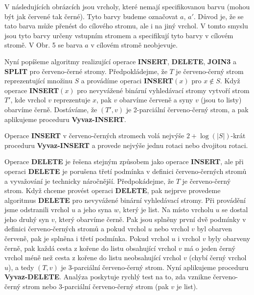 \documentclass[a4paper,12pt]{article}
\begin{document}
V následujících obrázcích jsou vrcholy, které 
nemají specifikovanou barvu (mohou být jak červené tak černé).
Tyto barvy budeme označovat $a$, $a'$. Důvod je, že se 
tato barva může přenést do cílového stromu, ale 
i na jiný vrchol. V tomto smyslu jsou tyto barvy určeny vstupním 
stromem a specifikují tyto barvy v cílovém stromě. V Obr. 5 
se barva $a$ v cílovém stromě neobjevuje.

\midinsert
\centerline{}
\endcaption
\endinsert

\midinsert
\centerline{}
\endcaption
\endinsert
\newpage

\midinsert
\centerline{}
\endcaption
\endinsert

\midinsert
\centerline{}
\endcaption
\endinsert

Nyní popíšeme algoritmy realizující operace {\bf INSERT}, 
{\bf DE\-LE\-TE}, {\bf JOIN3} a {\bf SPLIT} pro červeno-černé stromy.  
Před\-po\-klá\-dejme, že $T$ je červeno-černý strom reprezentující 
množinu $S$ a pro\-vá\-dí\-me operaci {\bf INSERT$(x)$} pro $
x\notin S$.  Když 
ope\-race {\bf IN\-SERT$(x)$} pro nevyvážené binární vyhledávací stro\-my 
vytvoří strom $T'$, kde vrchol $v$ reprezentuje $x$, pak $
v$ 
obar\-ví\-me červeně a syny $v$ (jsou to listy) obarvíme černě.  
Dostáváme, že $(T',v)$ je 2-parciální červeno-černý strom, a pak 
aplikujeme proceduru {\bf Vyvaz-INSERT}.  

Operace {\bf INSERT} v červeno-černých stromech 
volá nejvýše $2+\log(|S|)$-krát proceduru {\bf Vyvaz-INSERT} a 
provede nejvýše jednu rotaci nebo dvojitou rotaci.

Operace {\bf DELETE} je řešena stejným způsobem 
jako ope\-race {\bf INSERT}, ale při operaci {\bf DELETE} je porušena třetí 
pod\-mín\-ka v definici červeno-černých stro\-mů a 
vyvažování je technicky náročnější.  
Předpokádejme, že $T$ je červeno-černý strom. Když chceme 
provést operaci {\bf DELETE}, pak nejprve provedeme algoritmus {\bf DELETE} 
pro nevyvážené 
binární vyhledávací stro\-my. Při provádění jsme 
odstranili vrchol $u$ a jeho syna $w$, který je list. Na 
místo vrcholu $u$ se dostal jeho druhý syn $v$, který 
obarvíme černě. Pak jsou splněny první 
dvě podmínky v definici červeno-černých 
stromů a pokud vrchol $u$ nebo vrchol $v$ byl
obarven červeně, pak je splněna i 
třetí podmínka. Pokud vrchol $u$ i vrchol $v$ byly obarveny 
černě, pak každá cesta z kořene do listu obsahující 
vrchol $v$ má o jeden černý  vrchol méně  než cesta z 
kořene do listu neobsahující vrchol $v$ (chybí černý  
vrchol $u$), a tedy $(T,v)$ je 3-parciální červeno-černý strom. 
Nyní aplikujeme proceduru {\bf Vyvaz-DELETE}.
Analýza poskytuje rychlý test na to, zda 
vznikne červeno-černý strom nebo 3-parciální 
červeno-černý strom (pak $v$ je list). 
\end{document}
